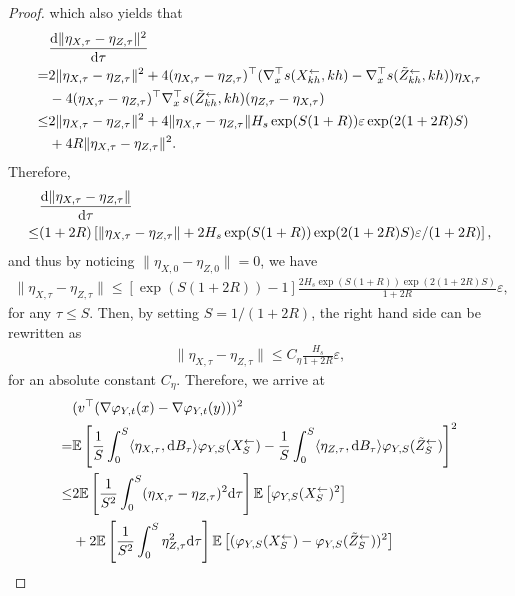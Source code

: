 \begin{proof}
which also yields that 
\begin{align}
& \frac{{\textnormal{d}} \|\eta_{{X},\tau} - \eta_{Z,\tau}\|^2}{{\textnormal{d}} \tau}  \\
=& 2 \| \eta_{{X},\tau} -  \eta_{Z,\tau}\|^2 + 
4 (\eta_{{X},\tau} -  \eta_{Z,\tau})^\top (\nabla_x^\top s({X}_{kh}^\leftarrow,kh) - \nabla_x^\top s(\tilde{Z}_{kh}^\leftarrow,kh)) 
\eta_{{X},\tau} \\
& - 
4 (\eta_{{X},\tau} -  \eta_{Z,\tau})^\top \nabla_x^\top s(\tilde{Z}_{kh}^\leftarrow,kh)(\eta_{Z,\tau} -  \eta_{{X},\tau}) \\
\leq & 2 \| \eta_{{X},\tau} -  \eta_{Z,\tau}\|^2 + 
4 \|\eta_{{X},\tau} -  \eta_{Z,\tau}\| H_s \exp(S(1+R)) \varepsilon  
\exp(2(1+2R)S) \\
& +  
4 R \|\eta_{{X},\tau} -  \eta_{Z,\tau}\|^2. 
\end{align} 
Therefore, 
\begin{align}
& \frac{{\textnormal{d}} \|\eta_{{X},\tau} - \eta_{Z,\tau}\|}{{\textnormal{d}} \tau}  \\
\leq & (1 + 2R) \left[ \| \eta_{{X},\tau} -  \eta_{Z,\tau}\| + 
2 H_s \exp(S(1+R))   
\exp(2(1+2R)S) \varepsilon / (1 + 2R) \right],
\end{align}
and thus by noticing $\|\eta_{{X},0} - \eta_{Z,0}\| = 0$, we have 
\begin{align}
\|\eta_{{X},\tau} - \eta_{Z,\tau}\| \leq 
[\exp(S (1 + 2R)) -1] \frac{2 H_s\exp(S(1+R))   
\exp(2(1+2R)S)  }{1 + 2R} \varepsilon,
\end{align}
for any $\tau \leq S$. Then, by setting $S = 1/(1+2R)$, the right hand side can be rewritten as 
\begin{align}
\|\eta_{{X},\tau} - \eta_{Z,\tau}\| \leq 
C_\eta  \frac{H_s}{1 + 2R} \varepsilon,
\end{align}
for an absolute constant $C_\eta$. 
Therefore, we arrive at 
\begin{align} 
& (v^\top (\nabla \varphi_{Y,t}(x) - \nabla \varphi_{Y,t}(y)))^2 \\
=  & \E\left[ \frac{1}{S}\int_{0}^S \langle \eta_{{X},\tau}, \rd B_\tau \rangle \varphi_{Y,S}({X}_{S}^\leftarrow) 
-
\frac{1}{S}\int_{0}^S \langle \eta_{Z,\tau}, \rd B_\tau \rangle \varphi_{Y,S}(\tilde{Z}_{S}^\leftarrow)
\right]^2 \\
\leq & 
  2 \E\left[ \frac{1}{S^2} \int_{0}^S (\eta_{{X},\tau} - \eta_{Z,\tau})^2 \rd \tau \right] 
  \E\left[\varphi_{Y,S}({X}_{S}^\leftarrow)^2\right]  \\
&   + 
   2  \E\left[ \frac{1}{S^2} \int_{0}^S \eta_{Z,\tau}^2 \rd \tau \right] 
  \E\left[(\varphi_{Y,S}({X}_{S}^\leftarrow) - \varphi_{Y,S}(\tilde{Z}_{S}^\leftarrow))^2\right] \\

\end{align}
\end{proof}
